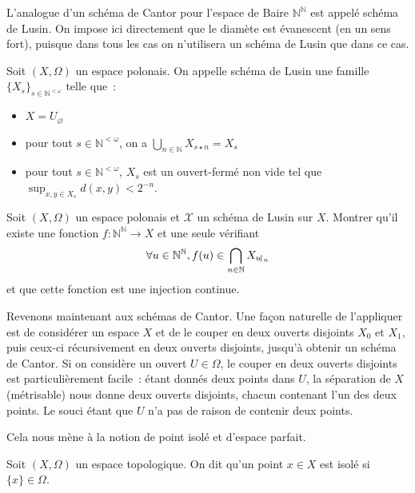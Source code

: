 L'analogue d'un schéma de Cantor pour l'espace de Baire $\mathbb N^\mathbb N$
est appelé schéma de Lusin. On impose ici directement que le diamète est
évanescent (en un sens fort), puisque dans tous les cas on n'utilisera un schéma
de Lusin que dans ce cas.

\begin{definition}
  Soit $(X,\Omega)$ un espace polonais. On appelle schéma de Lusin une famille
  $\{X_s\}_{s\in \mathbb N^{<\omega}}$ telle que~:
  \begin{itemize}
  \item $X = U_{\varnothing}$
  \item pour tout $s\in \mathbb N^{<\omega}$, on a
    $\displaystyle \bigcup_{n\in\mathbb N} X_{s\star n} = X_s$
  \item pour tout $s\in\mathbb N^{<\omega}$, $X_s$ est un ouvert-fermé non vide
    tel que $\displaystyle\sup_{x,y\in X_s} d(x,y) < 2^{-n}$.
  \end{itemize}
\end{definition}

\begin{exercise}\label{exo.Lusin.inj}
  Soit $(X,\Omega)$ un espace polonais et $\mathcal X$ un schéma de Lusin sur
  $X$. Montrer qu'il existe une fonction $f : \mathbb N^\mathbb N \to X$
  et une seule vérifiant
  \[\forall u \in \mathbb N^\mathbb N, f(u) \in
  \bigcap_{n \in \mathbb N} X_{u\!\upharpoonright_{n}}\]
  et que cette fonction est une injection continue.
\end{exercise}

Revenons maintenant aux schémas de Cantor. Une façon naturelle de l'appliquer
est de considérer un espace $X$ et de le couper en deux ouverts disjoints
$X_0$ et $X_1$, puis ceux-ci récursivement en deux ouverts disjoints, jusqu'à
obtenir un schéma de Cantor. Si on considère un ouvert $U\in \Omega$, le
couper en deux ouverts disjoints est particulièrement facile~: étant donnés deux
points dans $U$, la séparation de $X$ (métrisable) nous donne deux ouverts
disjoints, chacun contenant l'un des deux points. Le souci étant que $U$ n'a pas
de raison de contenir deux points.

Cela nous mène à la notion de point isolé et d'espace parfait.

\begin{definition}
  Soit $(X,\Omega)$ un espace topologique. On dit qu'un point $x\in X$ est isolé
  si $\{x\}\in\Omega$.
\end{definition}

